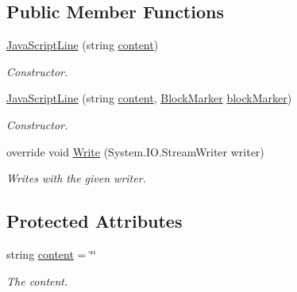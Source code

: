 \subsection*{Public Member Functions}
\begin{DoxyCompactItemize}
\item 
\hyperlink{class_a_rdev_kit_1_1_model_1_1_project_1_1_file_1_1_java_script_line_a3c2a2def231b41e9d5905bdc824b5b95}{Java\-Script\-Line} (string \hyperlink{class_a_rdev_kit_1_1_model_1_1_project_1_1_file_1_1_java_script_line_ac13eaaa9582b295e64a38594f11abb6e}{content})
\begin{DoxyCompactList}\small\item\em Constructor. \end{DoxyCompactList}\item 
\hyperlink{class_a_rdev_kit_1_1_model_1_1_project_1_1_file_1_1_java_script_line_a0806a95abacfe4e3f61fd791f26fbc30}{Java\-Script\-Line} (string \hyperlink{class_a_rdev_kit_1_1_model_1_1_project_1_1_file_1_1_java_script_line_ac13eaaa9582b295e64a38594f11abb6e}{content}, \hyperlink{class_a_rdev_kit_1_1_model_1_1_project_1_1_file_1_1_block_marker}{Block\-Marker} \hyperlink{class_a_rdev_kit_1_1_model_1_1_project_1_1_file_1_1_abstract_block_a0975ceb65947c7370dcb6565677e9d0e}{block\-Marker})
\begin{DoxyCompactList}\small\item\em Constructor. \end{DoxyCompactList}\item 
override void \hyperlink{class_a_rdev_kit_1_1_model_1_1_project_1_1_file_1_1_java_script_line_a9a1d47796fc64a50ccd602df70d1d562}{Write} (System.\-I\-O.\-Stream\-Writer writer)
\begin{DoxyCompactList}\small\item\em Writes with the given writer. \end{DoxyCompactList}\end{DoxyCompactItemize}
\subsection*{Protected Attributes}
\begin{DoxyCompactItemize}
\item 
string \hyperlink{class_a_rdev_kit_1_1_model_1_1_project_1_1_file_1_1_java_script_line_ac13eaaa9582b295e64a38594f11abb6e}{content} = \char`\"{}\char`\"{}
\begin{DoxyCompactList}\small\item\em The content. \end{DoxyCompactList}\end{DoxyCompactItemize}
